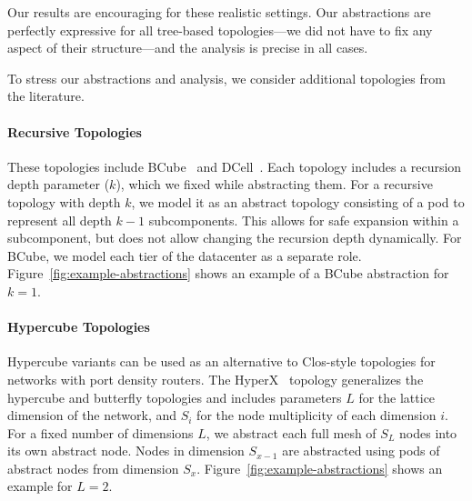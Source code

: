 \documentclass[numbers, 10pt, preprint]{sigplanconf}
\newcommand{\EG}{\emph{e.g.}}
\newcommand{\para}[1]{\paragraph*{\textbf{#1}}}
\begin{document}
Our results are encouraging for these realistic settings. Our abstractions are perfectly expressive for all tree-based topologies---we did not have to fix any aspect of their structure---and the analysis is precise in all cases.



%

To stress our abstractions and analysis, we consider additional topologies from the literature.

\para{Recursive Topologies}
These topologies include BCube~\cite{bcube} and DCell~\cite{dcell}. Each topology includes a recursion depth parameter ($k$), which we fixed while abstracting them. For a recursive topology with depth $k$, we model it as an abstract topology consisting of a pod to represent all depth $k-1$ subcomponents. This allows for safe expansion within a subcomponent, but does not allow changing the recursion depth dynamically. 
For BCube, we model each tier of the datacenter as a separate role. Figure~\ref{fig:example-abstractions} shows an example of a BCube abstraction for $k=1$.

\para{Hypercube Topologies}
Hypercube variants can be used as an alternative to Clos-style topologies for networks with port density routers. The HyperX~\cite{hyperx} topology generalizes the hypercube and butterfly topologies and includes parameters $L$ for the lattice dimension of the network, and $S_i$ for the node multiplicity of each dimension $i$.
For a fixed number of dimensions $L$, we abstract each full mesh of $S_L$ nodes into its own abstract node. Nodes in dimension $S_{x-1}$ are abstracted using pods of abstract nodes from dimension $S_x$. Figure~\ref{fig:example-abstractions} shows an example for $L=2$.
\end{document}

